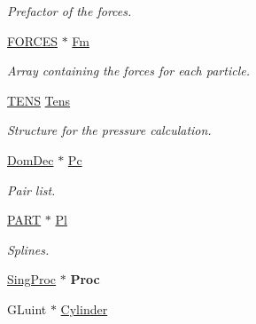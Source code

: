 \begin{DoxyCompactItemize}
\begin{DoxyCompactList}\small\item\em Prefactor of the forces. \end{DoxyCompactList}\item 
\hyperlink{structFORCES}{F\+O\+R\+C\+ES} $\ast$ \hyperlink{classForces_afca243db3841bf482910199bdb22e5f3}{Fm}\hypertarget{classForces_afca243db3841bf482910199bdb22e5f3}{}\label{classForces_afca243db3841bf482910199bdb22e5f3}

\begin{DoxyCompactList}\small\item\em Array containing the forces for each particle. \end{DoxyCompactList}\item 
\hyperlink{structTENS}{T\+E\+NS} \hyperlink{classForces_a77e000512807ae8da791d650d739299a}{Tens}\hypertarget{classForces_a77e000512807ae8da791d650d739299a}{}\label{classForces_a77e000512807ae8da791d650d739299a}

\begin{DoxyCompactList}\small\item\em Structure for the pressure calculation. \end{DoxyCompactList}\item 
\hyperlink{classDdLinkedList}{Dom\+Dec} $\ast$ \hyperlink{classForces_a5d8052dd63b08f01b581aeffa8506051}{Pc}\hypertarget{classForces_a5d8052dd63b08f01b581aeffa8506051}{}\label{classForces_a5d8052dd63b08f01b581aeffa8506051}

\begin{DoxyCompactList}\small\item\em Pair list. \end{DoxyCompactList}\item 
\hyperlink{structPART}{P\+A\+RT} $\ast$ \hyperlink{classForces_af6f3b943a0341846e18ac90f4f871b98}{Pl}\hypertarget{classForces_af6f3b943a0341846e18ac90f4f871b98}{}\label{classForces_af6f3b943a0341846e18ac90f4f871b98}

\begin{DoxyCompactList}\small\item\em Splines. \end{DoxyCompactList}\item 
\hyperlink{classSingProc}{Sing\+Proc} $\ast$ {\bfseries Proc}\hypertarget{classForces_adde8a4e5814f247c722934064b0f68b9}{}\label{classForces_adde8a4e5814f247c722934064b0f68b9}

\item 
G\+Luint $\ast$ \hyperlink{classForces_a10385a058195a115177656da1926ee5b}{Cylinder}\hypertarget{classForces_a10385a058195a115177656da1926ee5b}{}\label{classForces_a10385a058195a115177656da1926ee5b}


\end{DoxyCompactItemize}
